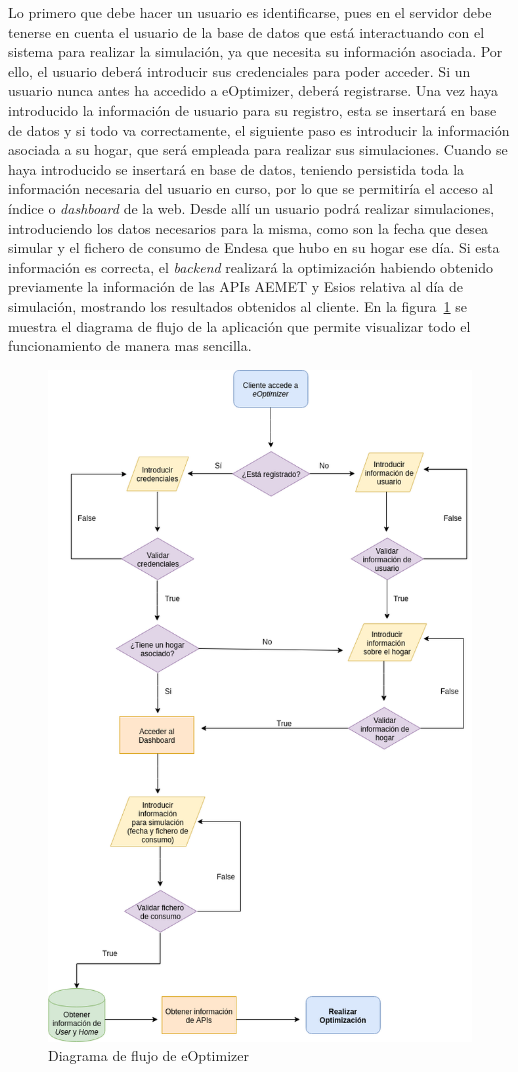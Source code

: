 Lo primero que debe hacer un usuario es identificarse, pues en el servidor debe tenerse en cuenta el usuario de la base de datos que está interactuando con el sistema para realizar la simulación, ya que necesita su información asociada. Por ello, el usuario deberá introducir sus credenciales para poder acceder. Si un usuario nunca antes ha accedido a eOptimizer, deberá registrarse. Una vez haya introducido la información de usuario para su registro, esta se insertará en base de datos y si todo va correctamente, el siguiente paso es introducir la información asociada a su hogar, que será empleada para realizar sus simulaciones. Cuando se haya introducido se insertará en base de datos, teniendo persistida toda la información necesaria del usuario en curso, por lo que se permitiría el acceso al índice o \textit{dashboard} de la web. Desde allí un usuario podrá realizar simulaciones, introduciendo los datos necesarios para la misma, como son la fecha que desea simular y el fichero de consumo de Endesa que hubo en su hogar ese día. Si esta información es correcta, el \textit{backend} realizará la optimización habiendo obtenido previamente la información de las APIs AEMET y Esios relativa al día de simulación, mostrando los resultados obtenidos al cliente. En la figura~\ref{fig:diagrama-flujo} se muestra el diagrama de flujo de la aplicación que permite visualizar todo el funcionamiento de manera mas sencilla.
\begin{figure}[!h]
            \centering
            \includegraphics[width=15cm]{figs/diagrama_flujo.png}
            \caption{Diagrama de flujo de eOptimizer}
            \label{fig:diagrama-flujo}
\end{figure}
